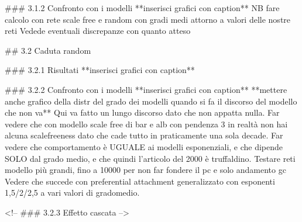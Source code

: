 ### 3.1.2 Confronto con i modelli
**inserisci grafici con caption**  
NB fare calcolo con rete scale free e random con gradi medi attorno a valori delle nostre reti
Vedede eventuali discrepanze con quanto atteso

## 3.2 Caduta random

### 3.2.1 Risultati
**inserisci grafici con caption**  

### 3.2.2 Confronto con i modelli
**inserisci grafici con caption**  
**mettere anche grafico della distr del grado dei modelli quando si fa il discorso del modello che non va**  
Qui va fatto un lungo discorso dato che non appatta nulla. Far vedere che con modello scale free di bar e alb con pendenza 3 in realtà non hai alcuna scalefreeness dato che cade tutto in praticamente una sola decade. Far vedere che comportamento è UGUALE ai modelli esponenziali, e che dipende SOLO dal grado medio, e che quindi l'articolo del 2000 è truffaldino. Testare reti modello più grandi, fino a 10000 per non far fondere il pc e solo andamento gc
Vedere che succede con preferential attachment generalizzato con esponenti 1,5/2/2,5 a vari valori di gradomedio.

<!-- ### 3.2.3 Effetto cascata -->
